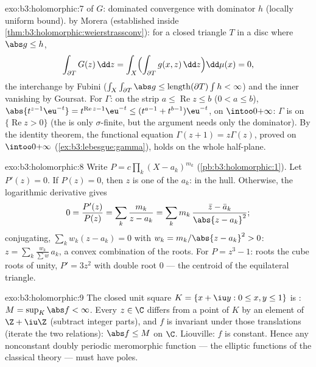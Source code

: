\begin{solution}{exo:b3:holomorphic:7}
 of $G$: dominated convergence with dominator $h$
(locally uniform bound).  by Morera (established
inside \cref{thm:b3:holomorphic:weierstrassconv}): for a
closed triangle $T$ in a disc where $\abs g \leq h$,
\[
\int_{\partial T}G(z)\,\dd z =
\int_X\Bigl(\int_{\partial T}g(x, z)\,\dd z\Bigr)\dd\mu(x) =
0,
\]
the interchange by Fubini ($\int_X\int_{\partial T}\abs
g \leq \operatorname{length}(\partial T)\int h < \infty$) and
the inner vanishing by Goursat. For $\Gamma$: on the strip $a
\leq \operatorname{Re}z \leq b$ ($0 < a \leq b$),
$\abs{t^{z-1}\eu^{-t}} = t^{\operatorname{Re}z-1}\eu^{-t} \leq
(t^{a-1} + t^{b-1})\eu^{-t}$,  on
$\intoo0{+\infty}$: $\Gamma$ is  on
$\{\operatorname{Re} z > 0\}$ (the  is only
$\sigma$-finite, but the argument needs only the 
dominator). By the identity theorem, the functional equation
$\Gamma(z + 1) = z\Gamma(z)$, proved on
$\intoo0{+\infty}$ (\cref{ex:b3:lebesgue:gamma}), holds on the
whole half-plane.
\end{solution}

\begin{solution}{exo:b3:holomorphic:8}
Write $P = c\prod_k(X - a_k)^{m_k}$
(\cref{pb:b3:holomorphic:1}). Let $P'(z) = 0$. If $P(z) = 0$,
then $z$ is one of the $a_k$: in the hull. Otherwise, the
logarithmic derivative gives
\[
0 = \frac{P'(z)}{P(z)} = \sum_k\frac{m_k}{z - a_k}
= \sum_k m_k\,\frac{\bar z - \bar a_k}{\abs{z - a_k}^2} ;
\]
conjugating, $\sum_kw_k(z - a_k) = 0$ with $w_k = m_k/\abs{z -
a_k}^2 > 0$: $z = \sum_k\frac{w_k}{\sum w}\,a_k$, a convex
combination of the roots. For $P = z^3 - 1$: roots the cube
roots of unity, $P' = 3z^2$ with double root $0$ --- the
centroid of the equilateral triangle.
\end{solution}

\begin{solution}{exo:b3:holomorphic:9}
The closed unit square $K = \{x + \iu y : 0 \leq x, y \leq
1\}$ is : $M = \sup_K\abs f < \infty$. Every $z \in \C$
differs from a point of $K$ by an element of $\Z + \iu\Z$
(subtract integer parts), and $f$ is invariant under those
translations (iterate the two relations): $\abs f \leq M$ on
$\C$. Liouville: $f$ is constant. Hence any nonconstant
doubly periodic meromorphic function --- the elliptic
functions of the classical theory --- must have poles.
\end{solution}

